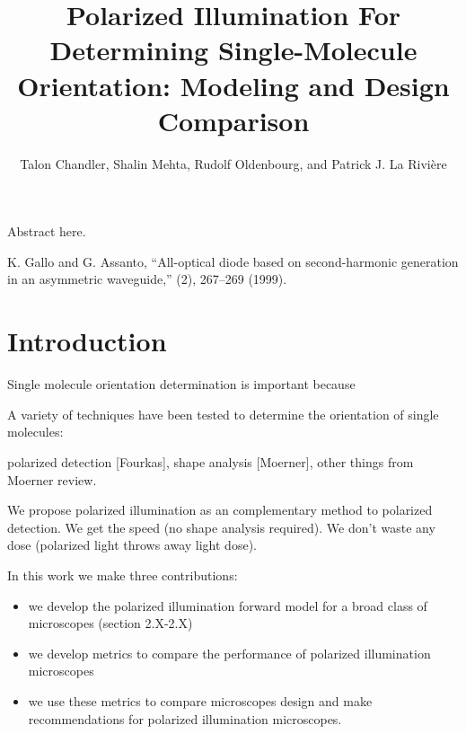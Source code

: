 \documentclass[10pt]{article}
\begin{document}
\title{Polarized Illumination For Determining Single-Molecule Orientation:
  Modeling and Design Comparison}

\author{Talon Chandler, Shalin Mehta, Rudolf Oldenbourg, and Patrick J. La Rivi\`ere}

\address{University of Chicago, Department of Radiology, Chicago, IL, USA.\\
Marine Biological Laboratory, Bell Center for Regenerative Medicine, Woods Hole, MA, USA.\\
Brown University, Department of Physics, Providence, RI, USA.}

\begin{abstract*}
Abstract here. 
\end{abstract*}


\begin{thebibliography}{99}
 K. Gallo and G. Assanto, ``All-optical diode based on second-harmonic generation in an asymmetric waveguide,'' (2), 267--269 (1999).
\end{thebibliography}

\section{Introduction}
Single molecule orientation determination is important because

A variety of techniques have been tested to determine the orientation of
single molecules:

polarized detection [Fourkas], shape analysis [Moerner], other things from
Moerner review. 

We propose polarized illumination as an complementary method to polarized
detection. We get the speed (no shape analysis required). We don't waste any
dose (polarized light throws away light dose). 

In this work we make three contributions:
\begin{itemize}
\item we develop the polarized illumination forward model for a broad class of
  microscopes (section 2.X-2.X)
\item we develop metrics to compare the performance of polarized illumination
  microscopes 
\item we use these metrics to compare microscopes design and make recommendations
  for polarized illumination microscopes. 
\end{itemize}
\end{document}
